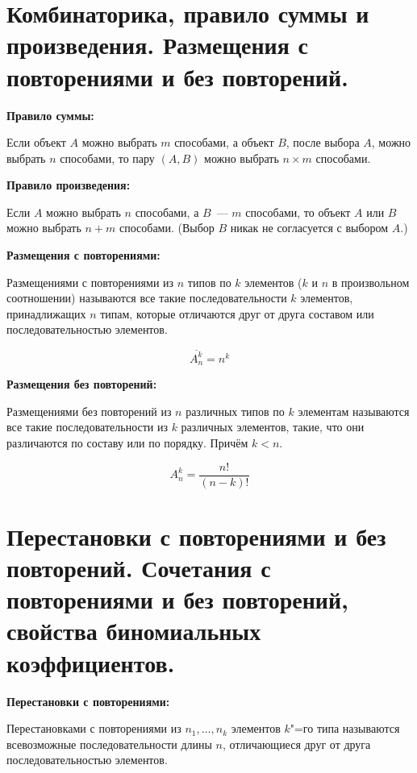 


    
\tableofcontents

\newpage

\section{Комбинаторика, правило суммы и произведения.
Размещения с повторениями и без повторений.}

\textbf{Правило суммы:}
    \smallskip

    Если объект $A$ можно выбрать $m$ способами, а объект $B$, после выбора $A$, 
    можно выбрать $n$ способами, то пару $(A, B)$ можно выбрать $n \times m$
    способами.
    \bigskip

\textbf{Правило произведения:}
    \smallskip

    Если $A$ можно выбрать $n$ способами, а $B$~--- $m$ способами, то объект 
    $A$ или $B$ можно выбрать $n + m$ способами. (Выбор $B$ никак не
    согласуется с выбором $A$.)
    \bigskip

\textbf{Размещения с повторениями:}
    \smallskip
    
    Размещениями с повторениями из $n$ типов по $k$ элементов ($k$ и $n$ в произвольном
    соотношении) называются все такие последовательности $k$ элементов,
    принадлижащих $n$ типам, которые отличаются друг от друга составом
    или последовательностью элементов. 
    
    \[
        \overline{A^{k}_n} = n^k 
    \]
    \bigskip

\textbf{Размещения без повторений:}
    \smallskip
    
    Размещениями без повторений из $n$ различных типов по $k$ элементам называются
    все такие последовательности из $k$ различных элементов, такие, что они
    различаются по составу или по порядку. Причём $k < n$.

    \[
        A^k_n = \frac{n!}{(n - k)!}  
    \]

\section{Перестановки с повторениями и без повторений. Сочетания с повторениями 
и без повторений, свойства биномиальных коэффициентов.}

\textbf{Перестановки с повторениями:}
    \smallskip

    Перестановками с повторениями из $n_1, \dots, n_k$ элементов $k$"=го типа 
    называются всевозможные последовательности длины $n$, отличающиеся друг от
    друга последовательностью элементов.

